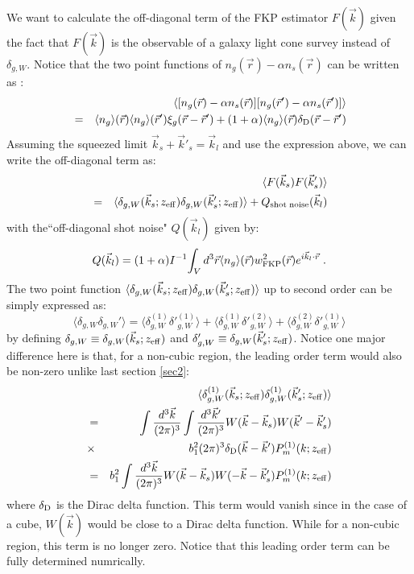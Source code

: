 \documentclass[prd,amsmath,amssymb,floatfix,superscriptaddress,nofootinbib,twocolumn]{revtex4-1}
\def\be{\begin{equation}}
\def\ee{\end{equation}}
\def\bea{\begin{eqnarray}}
\def\eea{\end{eqnarray}}
\newcommand{\vrr}{\vec{r}}
\newcommand{\vs}{\nonumber\\}
\newcommand{\vk}{\vec{k}}
\begin{document}
We want to calculate the off-diagonal term of the FKP estimator $F(\vk)$ given the fact that $F(\vk)$ is the observable of a galaxy light cone survey instead of $\delta_{g,W}$. Notice that the two point functions of $n_{g}(\vec{r})-\alpha n_{s}(\vec{r})$ can be written as \cite{Feldman:1993ky}:
\begin{eqnarray}
&&\langle [n_{g}(\vec{r})-\alpha n_{s}(\vec{r})][n_{g}(\vec{r}')-\alpha n_{s}(\vec{r}')]\rangle\nonumber\\
&=&\langle n_{g}\rangle(\vec{r})\langle n_{g}\rangle(\vec{r}')\xi_{g}(\vec{r}-\vec{r}')+(1+\alpha)\langle n_{g}\rangle(\vec{r})\delta_{\rm D}(\vec{r}-\vec{r}')\vs
\end{eqnarray}
Assuming the squeezed limit $\vec{k}_s+\vec{k}'_s=\vec{k}_l$ and use the expression above, we can write the off-diagonal term as:
\begin{eqnarray}
&&\langle F(\vec{k}_s)F(\vec{k}'_s)\rangle\nonumber\\
&=&\langle \delta_{g,W}(\vec{k}_s;z_{\rm eff})\delta_{g,W}(\vec{k}'_s;z_{\rm eff}) \rangle+Q_{\rm shot \; noise}(\vec{k}_l)
\end{eqnarray}
with the``off-diagonal shot noise" $Q(\vk_l)$ given by:
\be 
Q(\vk_l)=(1+\alpha)I^{-1}{\int_{V}d^{3}\vec{r} \langle n_{g}\rangle (\vec{r}) w_{\rm FKP}^{2}(\vec{r})e^{i\vec{k}_l\cdot \vrr}}\;.
\ee 
The two point function $\langle \delta_{g,W}(\vec{k}_s;z_{\rm eff})\delta_{g,W}(\vec{k}'_s;z_{\rm eff}) \rangle$ up to second order can be simply expressed as:
\be 
\langle \delta_{g,W}\delta_{g,W}' \rangle=\langle \delta^{(1)}_{g,W}\delta'^{(1)}_{g,W} \rangle+\langle \delta^{(1)}_{g,W}\delta'^{(2)}_{g,W} \rangle+\langle \delta^{(2)}_{g,W}\delta'^{(1)}_{g,W} \rangle
\ee
by defining $\delta_{g,W}\equiv\delta_{g,W}(\vec{k}_s;z_{\rm eff})$ and $\delta_{g,W}'\equiv\delta_{g,W}(\vec{k}'_s;z_{\rm eff})$. Notice one major difference here is that, for a non-cubic region, the leading order term would also be non-zero unlike last section \ref{sec2}:
\bea
&&\langle\delta^{(1)}_{g,W}(\vec{k}_s;z_{\rm eff})\delta^{(1)}_{g,W}(\vec{k}'_s;z_{\rm eff})\rangle \vs
&=&\int \frac{d^3\vec{k}}{(2\pi)^3}\int \frac{d^3\vec{k}'}{(2\pi)^3}W(\vk-\vk_s)W(\vk'-\vk'_s)\vs
&\times & b_1^2 (2\pi)^3\delta_{\rm D} (\vk-\vk') P_m^{(1)}(k;z_{\rm eff})\vs
&=&b_1^2\int \frac{d^3\vec{k}}{(2\pi)^3}W(\vk-\vk_s)W(-\vk-\vk'_s)P_m^{(1)}(k;z_{\rm eff})
\eea 
where $\delta_{\rm D}$ is the Dirac delta function. This term would vanish since in the case of a cube, $W(\vk)$ would be close to a Dirac delta function. While for a non-cubic region, this term is no longer zero. Notice that this leading order term can be fully determined numrically.
\end{document}
